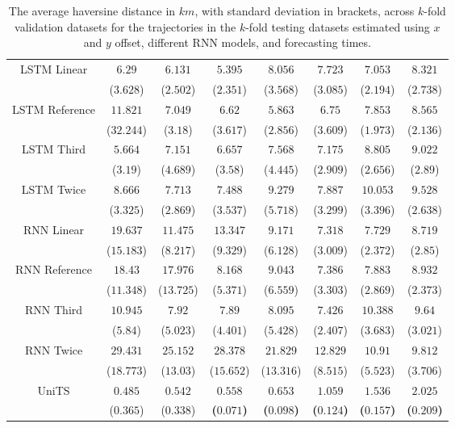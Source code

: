 \begin{table}[!ht]
{\begin{tabular}{|c|c|c|c|c|c|c|c|}
			\multirow{2}{*}{LSTM Linear} & $6.29$ & $6.131$ & $5.395$ & $8.056$ & $7.723$ & $7.053$ & $8.321$ \\
			 & ($3.628$) & ($2.502$) & ($2.351$) & ($3.568$) & ($3.085$) & ($2.194$) & ($2.738$) \\ \hline
			\multirow{2}{*}{LSTM Reference} & $11.821$ & $7.049$ & $6.62$ & $5.863$ & $6.75$ & $7.853$ & $8.565$ \\
			 & ($32.244$) & ($3.18$) & ($3.617$) & ($2.856$) & ($3.609$) & ($1.973$) & ($2.136$) \\ \hline
			\multirow{2}{*}{LSTM Third} & $5.664$ & $7.151$ & $6.657$ & $7.568$ & $7.175$ & $8.805$ & $9.022$ \\
			 & ($3.19$) & ($4.689$) & ($3.58$) & ($4.445$) & ($2.909$) & ($2.656$) & ($2.89$) \\ \hline
			\multirow{2}{*}{LSTM Twice} & $8.666$ & $7.713$ & $7.488$ & $9.279$ & $7.887$ & $10.053$ & $9.528$ \\
			 & ($3.325$) & ($2.869$) & ($3.537$) & ($5.718$) & ($3.299$) & ($3.396$) & ($2.638$) \\ \hline
			\multirow{2}{*}{RNN Linear} & $19.637$ & $11.475$ & $13.347$ & $9.171$ & $7.318$ & $7.729$ & $8.719$ \\
			 & ($15.183$) & ($8.217$) & ($9.329$) & ($6.128$) & ($3.009$) & ($2.372$) & ($2.85$) \\ \hline
			\multirow{2}{*}{RNN Reference} & $18.43$ & $17.976$ & $8.168$ & $9.043$ & $7.386$ & $7.883$ & $8.932$ \\
			 & ($11.348$) & ($13.725$) & ($5.371$) & ($6.559$) & ($3.303$) & ($2.869$) & ($2.373$) \\ \hline
			\multirow{2}{*}{RNN Third} & $10.945$ & $7.92$ & $7.89$ & $8.095$ & $7.426$ & $10.388$ & $9.64$ \\
			 & ($5.84$) & ($5.023$) & ($4.401$) & ($5.428$) & ($2.407$) & ($3.683$) & ($3.021$) \\ \hline
			\multirow{2}{*}{RNN Twice} & $29.431$ & $25.152$ & $28.378$ & $21.829$ & $12.829$ & $10.91$ & $9.812$ \\
			 & ($18.773$) & ($13.03$) & ($15.652$) & ($13.316$) & ($8.515$) & ($5.523$) & ($3.706$) \\ \hline
			\multirow{2}{*}{UniTS} & $0.485$ & $0.542$ & $\mathbf{0.558}$ & $\mathbf{0.653}$ & $\mathbf{1.059}$ & $\mathbf{1.536}$ & $\mathbf{2.025}$ \\
			 & ($0.365$) & ($0.338$) & \textbf{(}$\mathbf{0.071}$\textbf{)} & \textbf{(}$\mathbf{0.098}$\textbf{)} & \textbf{(}$\mathbf{0.124}$\textbf{)} & \textbf{(}$\mathbf{0.157}$\textbf{)} & \textbf{(}$\mathbf{0.209}$\textbf{)} \\ \hline
		\end{tabular}
	}
	\caption{The average haversine distance in $km$, with standard deviation in brackets, across $k$-fold validation datasets for the trajectories in the $k$-fold testing datasets estimated using $x$ and $y$ offset, different RNN models, and forecasting times.}
	\label{tab:all_no_abs_haversine}
\end{table}

